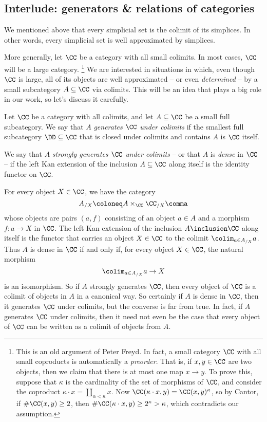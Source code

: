 
\subsection{Interlude: generators \& relations of categories \inc}%
\label{sub:generatorsrelations}
We mentioned above that every simplicial set is the colimit of its simplices.
In other words, every simplicial set is well approximated by simplices.

More generally, let $\CC$ be a category with all small colimits.
In most cases, $\CC$ will be a large category.%
\footnote{
  This is an old argument of Peter Freyd.
  In fact, a small category $\CC$ with all small coproducts is automatically a \emph{preorder}.
  That is, if $x,y \in \CC$ are two objects, then we claim that there is at most one map $x \to y$.
  To prove this, suppose that $\kappa$ is the cardinality of the set of morphisms of $\CC$, and consider the coproduct $\kappa \cdot x = \coprod_{\alpha < \kappa} x$.
  Now $\CC(\kappa \cdot x, y) = \CC(x,y)^{\kappa}$, so by Cantor, if $\#\CC(x,y) \geq 2$, then $\#\CC(\kappa\cdot x, y) \geq 2^\kappa > \kappa$, which contradicts our assumption.
}
We are interested in situations in which, even though $\CC$ is large, all of its objects are well approximated -- or even \emph{determined} -- by a small subcategory $A \subseteq \CC$ via colimits.
This will be an idea that plays a big role in our work, so let's discuss it carefully.

\begin{definition}
  Let $\CC$ be a category with all colimits, and let $A \subseteq \CC$ be a small full subcategory.
  We say that $A$ \emph{generates $\CC$ under colimits} if the smallest full subcategory $\DD \subseteq \CC$ that is closed under colimits and contains $A$ is $\CC$ itself.

  We say that $A$ \emph{strongly generates $\CC$ under colimits} -- or that $A$ is \emph{dense} in $\CC$ -- if the left Kan extension of the inclusion $A \subseteq \CC$ along itself is the identity functor on $\CC$.
\end{definition}

For every object $X \in \CC$, we have the category
\[
  A_{/X} \coloneq A \times_{\CC} \CC_{/X} \comma
\]
whose objects are pairs $(a,f)$ consisting of an object $a \in A$ and a morphism $f \colon a \to X$ in $\CC$.
The left Kan extension of the inclusion $A \inclusion \CC$ along itself is the functor that carries an object $X \in \CC$ to the colimit $\colim_{a \in A_{/X}} a$.
Thus $A$ is dense in $\CC$ if and only if, for every object $X \in \CC$, the natural morphism
\[
  \colim_{a \in A_{/X}} a \to X
\]
is an isomorphism.
So if $A$ strongly generates $\CC$, then every object of $\CC$ is a colimit of objects in $A$ in a canonical way.
So certainly if $A$ is dense in $\CC$, then it generates $\CC$ under colimits, but the converse is far from true.
In fact, if $A$ generates $\CC$ under colimits, then it need not even be the case that every object of $\CC$ can be written as a colimit of objects from $A$.

